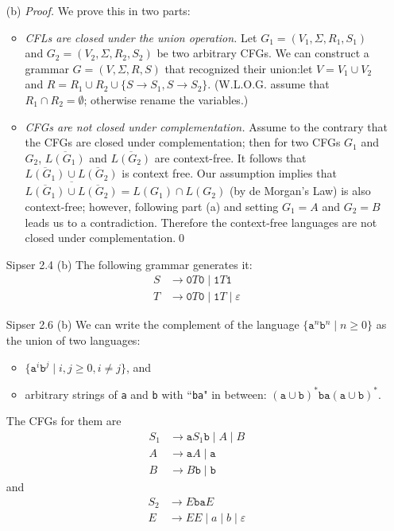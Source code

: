 \documentclass[12pt,a4paper]{ctexart}
\def\eps{\varepsilon}
\def\a{\texttt{a}}
\def\b{\texttt{b}}
\begin{document}
\begin{enumerate}
(b) \emph{Proof.} We prove this in two parts: 
\begin{itemize}
	\item \emph{\textsf{CFL}s are closed under the union operation.} Let $G_1 = (V_1, \Sigma, R_1, S_1)$ and $G_2 = (V_2, \Sigma, R_2, S_2)$ be two arbitrary \textsf{CFG}s. We can construct a grammar $G = (V, \Sigma , R, S)$ that recognized their union:let $V = V_1\cup V_2$ and $R = R_1\cup R_2\cup \{S\to S_1, S\to S_2\}$. (W.L.O.G. assume that $R_1\cap R_2 = \emptyset$; otherwise rename the variables.)
	\item \emph{\textsf{CFG}s are not closed under complementation.} Assume to the contrary that the \textsf{CFG}s are closed under complementation; then for two \textsf{CFG}s $G_1$ and $G_2$, $\overline{L(G_1)}$ and $\overline{L(G_2)}$ are context-free. It follows that $\overline{L(G_1)}\cup \overline{L(G_2)}$ is context free. Our assumption implies that $\overline{\overline{L(G_1)}\cup \overline{L(G_2)}} = L(G_1)\cap L(G_2)$ (by de Morgan's Law) is also context-free; however, following part (a) and setting $G_1 = A$ and $G_2 = B$ leads us to a contradiction. Therefore the context-free languages are not closed under complementation.\hfill\qed
\end{itemize}
\item[Sipser 2.4](b) The following grammar generates it: 
\begin{align*}
S & \to \mathtt{0}T\mathtt{0}\mid \mathtt{1}T\mathtt{1}
\\T & \to \mathtt{0}T\mathtt{0}\mid \mathtt{1}T \mid \eps
\end{align*}
\item[Sipser 2.6](b) We can write the complement of the language $\{\a^n\b^n\mid n\ge 0\}$ as the union of two languages:
\begin{itemize}
	\item $\{\a^i\b^j\mid i, j\ge 0 , i\ne j\}$, and
	\item arbitrary strings of \a{} and \b{} with ``\b\a" in between: $(\a\cup\b)^*\b\a(\a\cup\b)^*$.
\end{itemize}
The \textsf{CFG}s for them are
\begin{align*}
S_1 & \to \a S_1\b\mid A\mid B\\
A & \to \a A\mid \a\\
B & \to B\b \mid \b
\end{align*}
and
\begin{align*}
S_2 & \to E\b\a E\\
E & \to EE\mid a\mid b\mid\eps
\end{align*}

\end{enumerate}
\end{document}
